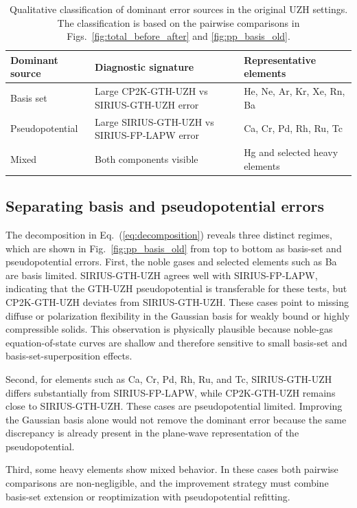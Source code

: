 \documentclass[aps,prb,reprint,amsmath,amssymb,superscriptaddress,longbibliography,floatfix]{revtex4-2}
\begin{document}
\begin{table}
\caption{\label{tab:classification}
Qualitative classification of dominant error sources in the original UZH settings. The classification is based on the pairwise comparisons in Figs.~\ref{fig:total_before_after} and \ref{fig:pp_basis_old}.}
\begin{ruledtabular}
\begin{tabular}{lll}
Dominant source & Diagnostic signature & Representative elements \\
\hline
Basis set & Large CP2K-GTH-UZH vs SIRIUS-GTH-UZH error & He, Ne, Ar, Kr, Xe, Rn, Ba \\
Pseudopotential & Large SIRIUS-GTH-UZH vs SIRIUS-FP-LAPW error & Ca, Cr, Pd, Rh, Ru, Tc \\
Mixed & Both components visible & Hg and selected heavy elements \\
\end{tabular}
\end{ruledtabular}
\end{table}

\subsection{Separating basis and pseudopotential errors}

The decomposition in Eq.~(\ref{eq:decomposition}) reveals three distinct regimes, which are shown in Fig.~\ref{fig:pp_basis_old} from top to bottom as basis-set and pseudopotential errors. First, the noble gases and selected elements such as Ba are basis limited. SIRIUS-GTH-UZH agrees well with SIRIUS-FP-LAPW, indicating that the GTH-UZH pseudopotential is transferable for these tests, but CP2K-GTH-UZH deviates from SIRIUS-GTH-UZH. These cases point to missing diffuse or polarization flexibility in the Gaussian basis for weakly bound or highly compressible solids. This observation is physically plausible because noble-gas equation-of-state curves are shallow and therefore sensitive to small basis-set and basis-set-superposition effects.

Second, for elements such as Ca, Cr, Pd, Rh, Ru, and Tc, SIRIUS-GTH-UZH differs substantially from SIRIUS-FP-LAPW, while CP2K-GTH-UZH remains close to SIRIUS-GTH-UZH. These cases are pseudopotential limited. Improving the Gaussian basis alone would not remove the dominant error because the same discrepancy is already present in the plane-wave representation of the pseudopotential.

Third, some heavy elements show mixed behavior. In these cases both pairwise comparisons are non-negligible, and the improvement strategy must combine basis-set extension or reoptimization with pseudopotential refitting.
\end{document}
